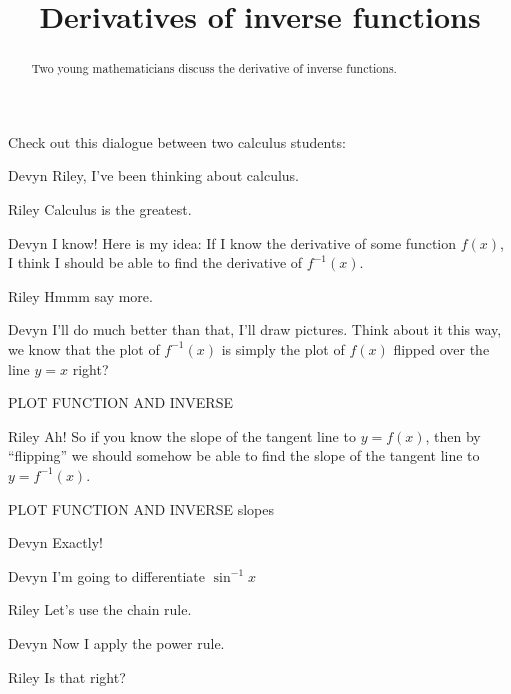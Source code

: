 \documentclass{ximera}
\title[Break-Ground:]{Derivatives of inverse functions}
\begin{document}
\begin{abstract}
Two young mathematicians discuss the derivative of inverse functions.
\end{abstract}
\maketitle

Check out this dialogue between two calculus students:

\begin{dialogue}
\item[Devyn] Riley, I've been thinking about calculus.
\item[Riley] Calculus is the greatest.
\item[Devyn] I know! Here is my idea: If I know the derivative of some
  function $f(x)$, I think I should be able to find the derivative of
  $f^{-1}(x)$.
\item[Riley] Hmmm say more.
\item[Devyn] I'll do much better than that, I'll draw pictures. Think
  about it this way, we know that the plot of $f^{-1}(x)$ is simply
  the plot of $f(x)$ flipped over the line $y=x$ right?
  \begin{image}
  PLOT FUNCTION AND INVERSE  
  \end{image}
\item[Riley] Ah! So if you know the slope of the tangent line to
  $y=f(x)$, then by ``flipping'' we should somehow be able to find the
  slope of the tangent line to $y=f^{-1}(x)$.
  \begin{image}
  PLOT FUNCTION AND INVERSE slopes 
  \end{image}
\item[Devyn] Exactly!
  
\item[Devyn] I'm going to differentiate $\sin^{-1} x$
\item[Riley] Let's use the chain rule.
\item[Devyn] Now I apply the power rule.
\item[Riley] Is that right?
\end{dialogue}





\end{document}
